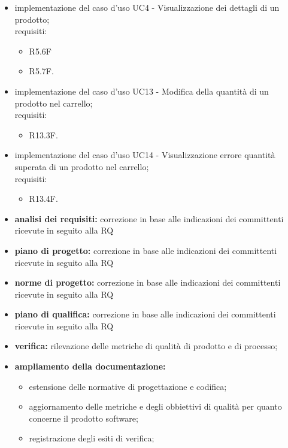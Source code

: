 \begin{itemize}
    \item implementazione del caso d'uso UC4 - Visualizzazione dei dettagli di un prodotto;\\requisiti:
          \begin{itemize}
              \item R5.6F
              \item R5.7F.
          \end{itemize}
    \item implementazione del caso d'uso UC13 -  Modifica della quantità di un prodotto nel carrello;\\requisiti:
          \begin{itemize}
              \item R13.3F.
          \end{itemize}
    \item implementazione del caso d'uso UC14 - Visualizzazione errore quantità superata di un prodotto nel carrello;\\requisiti:
          \begin{itemize}
              \item R13.4F.
          \end{itemize}
    \item \textbf{analisi dei requisiti:} correzione in base alle indicazioni dei committenti ricevute in seguito alla RQ
    \item \textbf{piano di progetto:} correzione in base alle indicazioni dei committenti ricevute in seguito alla RQ
    \item \textbf{norme di progetto:} correzione in base alle indicazioni dei committenti ricevute in seguito alla RQ
    \item \textbf{piano di qualifica:} correzione in base alle indicazioni dei committenti ricevute in seguito alla RQ
    \item \textbf{verifica:} rilevazione delle metriche di qualità di prodotto e di processo;
    \item \textbf{ampliamento della documentazione:}
          \begin{itemize}
              \item estensione delle normative di progettazione e codifica;
              \item aggiornamento delle metriche e degli obbiettivi di qualità per quanto concerne il prodotto software;
              \item registrazione degli esiti di verifica;

\end{itemize}
\end{itemize}

